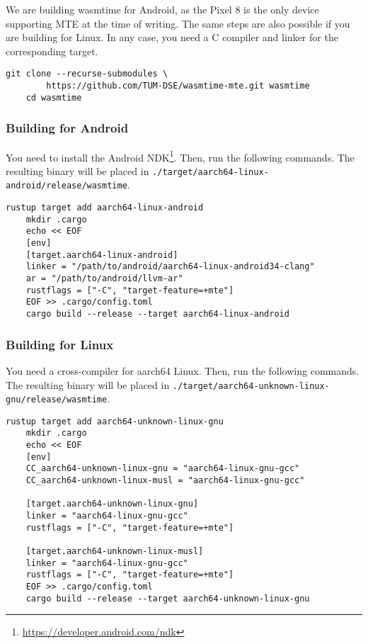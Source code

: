 We are building wasmtime for Android, as the Pixel 8 is the only device supporting \ac{MTE} at the time of writing.
The same steps are also possible if you are building for Linux.
In any case, you need a C compiler and linker for the corresponding target.

\begin{lstlisting}[label={lst:building-wasmtime}]
    git clone --recurse-submodules \
        https://github.com/TUM-DSE/wasmtime-mte.git wasmtime
    cd wasmtime
\end{lstlisting}

\subsubsection{Building for Android}

You need to install the Android NDK\footnote{\url{https://developer.android.com/ndk}}.
Then, run the following commands.
The resulting binary will be placed in \texttt{./target/aarch64-linux-android/release/wasmtime}.

\begin{lstlisting}[label={lst:configuring-wasmtime-android}]
    rustup target add aarch64-linux-android
    mkdir .cargo
    echo << EOF
    [env]
    [target.aarch64-linux-android]
    linker = "/path/to/android/aarch64-linux-android34-clang"
    ar = "/path/to/android/llvm-ar"
    rustflags = ["-C", "target-feature=+mte"]
    EOF >> .cargo/config.toml
    cargo build --release --target aarch64-linux-android
\end{lstlisting}

\subsubsection{Building for Linux}

You need a cross-compiler for aarch64 Linux.
Then, run the following commands.
The resulting binary will be placed in \texttt{./target/aarch64-unknown-linux-gnu/release/wasmtime}.

\begin{lstlisting}[label={lst:configuring-wasmtime-linux}]
    rustup target add aarch64-unknown-linux-gnu
    mkdir .cargo
    echo << EOF
    [env]
    CC_aarch64-unknown-linux-gnu = "aarch64-linux-gnu-gcc"
    CC_aarch64-unknown-linux-musl = "aarch64-linux-gnu-gcc"

    [target.aarch64-unknown-linux-gnu]
    linker = "aarch64-linux-gnu-gcc"
    rustflags = ["-C", "target-feature=+mte"]

    [target.aarch64-unknown-linux-musl]
    linker = "aarch64-linux-gnu-gcc"
    rustflags = ["-C", "target-feature=+mte"]
    EOF >> .cargo/config.toml
    cargo build --release --target aarch64-unknown-linux-gnu
\end{lstlisting}

